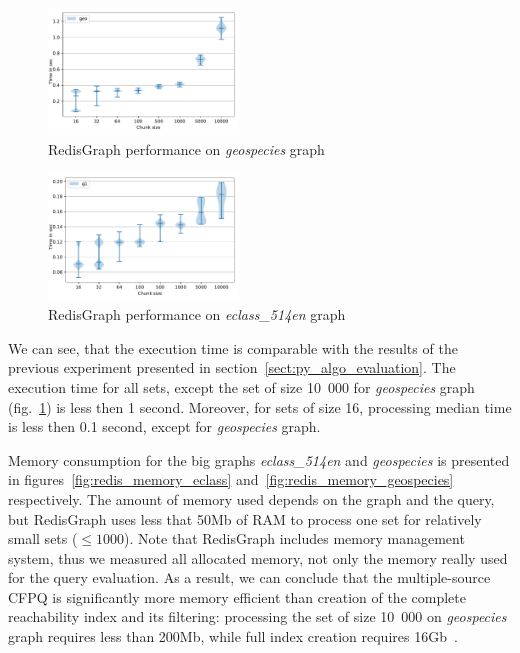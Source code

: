 \begin{figure}[h]
\centering
\includegraphics[width=0.45\textwidth]{data/raw_redis/geospecies.pdf}
\caption{RedisGraph performance on \textit{geospecies} graph}
\label{fig:redis_geospecies_all}
\end{figure}

\begin{figure}[h]
\centering
\includegraphics[width=0.45\textwidth]{data/raw_redis/eclass_514en.pdf}
\caption{RedisGraph performance on \textit{eclass\_514en} graph}
\label{fig:redis_eclass_all}
\end{figure}


We can see, that the execution time is comparable with the results of the previous experiment presented in section~\ref{sect:py_algo_evaluation}.
The execution time for all sets, except the set of size 10~000 for \textit{geospecies} graph (fig.~\ref{fig:redis_geospecies_all}) is less then 1 second.
Moreover, for sets of size 16, processing median time is less then 0.1 second, except for \textit{geospecies} graph.

Memory consumption for the big graphs \textit{eclass\_514en} and \textit{geospecies} is presented in figures~\ref{fig:redis_memory_eclass} and~\ref{fig:redis_memory_geospecies} respectively.
The amount of memory used depends on the graph and the query, but RedisGraph uses less that 50Mb of RAM to process one set for relatively small sets ($\leq 1000$).
Note that RedisGraph includes memory management system, thus we measured all allocated memory, not only the memory really used for the query evaluation.
As a result, we can conclude that the multiple-source CFPQ is significantly more memory efficient than creation of the complete reachability index and its filtering: processing the set of size 10~000 on \textit{geospecies} graph requires less than 200Mb, while full index creation requires 16Gb~\cite{10.1145/3398682.3399163}.

